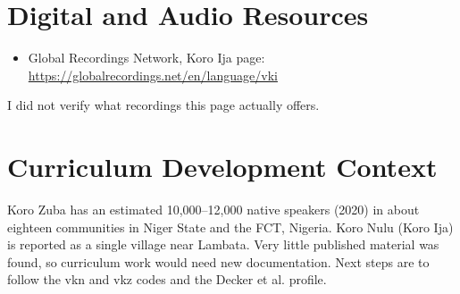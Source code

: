 \documentclass[12pt]{article}
\begin{document}
\section{Digital and Audio Resources}
\begin{itemize}
\item Global Recordings Network, Koro Ija page: \url{https://globalrecordings.net/en/language/vki}
\end{itemize}
I did not verify what recordings this page actually offers.

\section{Curriculum Development Context}
Koro Zuba has an estimated 10,000--12,000 native speakers (2020) in about eighteen communities in Niger State and the FCT, Nigeria. Koro Nulu (Koro Ija) is reported as a single village near Lambata. Very little published material was found, so curriculum work would need new documentation. Next steps are to follow the vkn and vkz codes and the Decker et al. profile.
\end{document}
